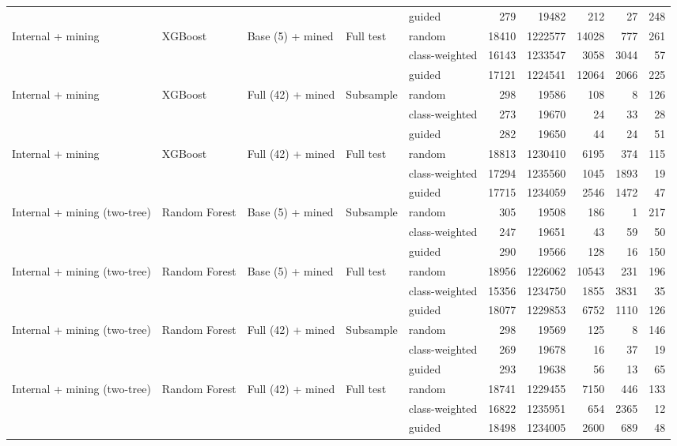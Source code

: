 \begin{longtable}{lllllrrrrr}
 &  &  &  & guided & 279 & 19482 & 212 & 27 & 248 \\
\addlinespace
Internal + mining & XGBoost & Base (5) + mined & Full test & random & 18410 & 1222577 & 14028 & 777 & 261 \\
 &  &  &  & class-weighted & 16143 & 1233547 & 3058 & 3044 & 57 \\
 &  &  &  & guided & 17121 & 1224541 & 12064 & 2066 & 225 \\
\addlinespace
Internal + mining & XGBoost & Full (42) + mined & Subsample & random & 298 & 19586 & 108 & 8 & 126 \\
 &  &  &  & class-weighted & 273 & 19670 & 24 & 33 & 28 \\
 &  &  &  & guided & 282 & 19650 & 44 & 24 & 51 \\
\addlinespace
Internal + mining & XGBoost & Full (42) + mined & Full test & random & 18813 & 1230410 & 6195 & 374 & 115 \\
 &  &  &  & class-weighted & 17294 & 1235560 & 1045 & 1893 & 19 \\
 &  &  &  & guided & 17715 & 1234059 & 2546 & 1472 & 47 \\
\addlinespace
Internal + mining (two-tree) & Random Forest & Base (5) + mined & Subsample & random & 305 & 19508 & 186 & 1 & 217 \\
 &  &  &  & class-weighted & 247 & 19651 & 43 & 59 & 50 \\
 &  &  &  & guided & 290 & 19566 & 128 & 16 & 150 \\
\addlinespace
Internal + mining (two-tree) & Random Forest & Base (5) + mined & Full test & random & 18956 & 1226062 & 10543 & 231 & 196 \\
 &  &  &  & class-weighted & 15356 & 1234750 & 1855 & 3831 & 35 \\
 &  &  &  & guided & 18077 & 1229853 & 6752 & 1110 & 126 \\
\addlinespace
Internal + mining (two-tree) & Random Forest & Full (42) + mined & Subsample & random & 298 & 19569 & 125 & 8 & 146 \\
 &  &  &  & class-weighted & 269 & 19678 & 16 & 37 & 19 \\
 &  &  &  & guided & 293 & 19638 & 56 & 13 & 65 \\
\addlinespace
Internal + mining (two-tree) & Random Forest & Full (42) + mined & Full test & random & 18741 & 1229455 & 7150 & 446 & 133 \\
 &  &  &  & class-weighted & 16822 & 1235951 & 654 & 2365 & 12 \\
 &  &  &  & guided & 18498 & 1234005 & 2600 & 689 & 48 \\

\end{longtable}
